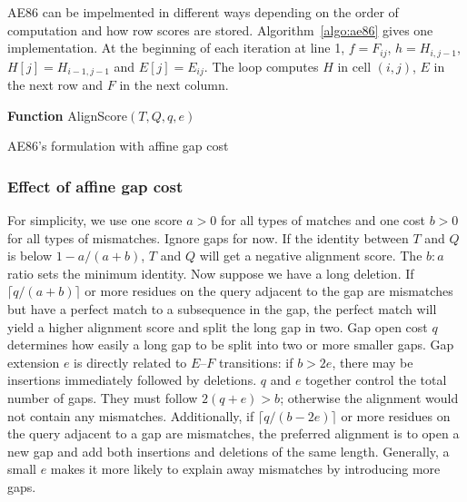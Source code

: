 \documentclass{bioinfo}
\begin{document}
AE86 can be impelmented in different ways depending on the order of computation
and how row scores are stored. Algorithm~\ref{algo:ae86} gives one
implementation. At the beginning of each iteration at line 1, $f=F_{ij}$,
$h=H_{i,j-1}$, $H[j]=H_{i-1,j-1}$ and $E[j]=E_{ij}$. The loop computes
$H$ in cell $(i,j)$, $E$ in the next row and $F$ in the next column.

\begin{algorithm}[tb]
\DontPrintSemicolon
\footnotesize
{}
\BlankLine
\textbf{Function} {\sc AlignScore}$(T,Q,q,e)$
\caption{AE86's formulation with affine gap cost}\label{algo:ae86}
\end{algorithm}

\subsubsection{Effect of affine gap cost}

For simplicity, we use one score $a>0$ for all types of matches and one cost
$b>0$ for all types of mismatches. Ignore gaps for now. If the identity between
$T$ and $Q$ is below $1-a/(a+b)$, $T$ and $Q$ will get a negative alignment
score. The $b:a$ ratio sets the minimum identity. Now suppose we have a long
deletion. If $\lceil q/(a+b)\rceil$ or more residues on the query adjacent to
the gap are mismatches but have a perfect match to a subsequence in the gap,
the perfect match will yield a higher alignment score and split the long gap in
two. Gap open cost $q$ determines how easily a long gap to be split into two or
more smaller gaps. Gap extension $e$ is directly related to $E$--$F$
transitions: if $b>2e$, there may be insertions immediately followed by
deletions. $q$ and $e$ together control the total number of gaps.  They must
follow $2(q+e)>b$; otherwise the alignment would not contain any mismatches.
Additionally, if $\lceil q/(b-2e)\rceil$ or more residues on the query adjacent
to a gap are mismatches, the preferred alignment is to open a new gap and add
both insertions and deletions of the same length. Generally, a small $e$ makes
it more likely to explain away mismatches by introducing more gaps.
\end{document}
